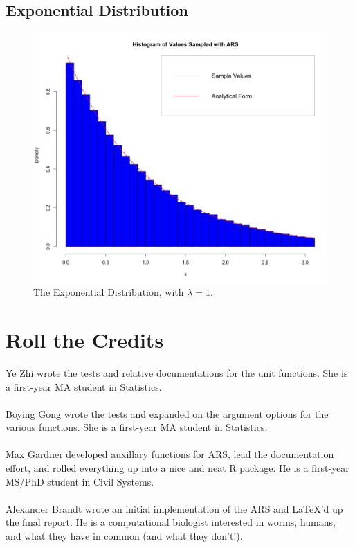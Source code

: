 \documentclass[12pt, oneside]{article}
\begin{document}
\subsection{Exponential Distribution}

\begin{figure}[H]
\centering
  \includegraphics[scale=.25]{figure/exponential.jpeg}
  \caption{The Exponential Distribution, with \(\lambda = 1\).}
  \label{fig:d3}
\end{figure}

\section{Roll the Credits}

Ye Zhi wrote the tests and relative documentations for the unit functions. She is a first-year MA student in Statistics. \\\\
Boying Gong wrote the tests and expanded on the argument options for the various functions. She is a first-year MA student in Statistics.\\\\
Max Gardner developed auxillary functions for ARS, lead the documentation effort, and rolled everything up into a nice and neat R package. He is a first-year MS/PhD student in Civil Systems.\\\\
Alexander Brandt wrote an initial implementation of the ARS and \LaTeX'd up the final report.  He is a computational biologist interested in worms, humans, and what they have in common (and what they don't!).\\
\end{document}
